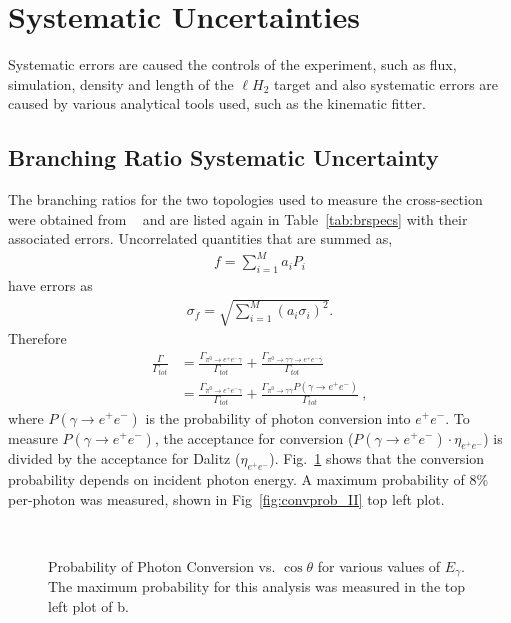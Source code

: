 \section{\label{sec:level1}Systematic Uncertainties}
 Systematic errors are caused the controls of the experiment, such as flux, simulation, density and length of the $\ell H_2$ target and also systematic errors are caused by various analytical tools used, such as the kinematic fitter.
 \subsection{Branching Ratio Systematic Uncertainty}
 The branching ratios for the two topologies used to measure the cross-section were obtained from \label{abbr:pdg}~\cite{pdg} and are listed again in Table~\ref{tab:brspecs} with their associated errors. Uncorrelated quantities that are summed as,
 \begin{align}
 	f = \sum_{i = 1}^{M}a_iP_i  
 \end{align}
 have errors as
 \begin{align}
 	\sigma_f = \sqrt{\sum_{i = 1}^{M}\left(a_i\sigma_i\right)^2}.  
 \end{align}
 Therefore
 \begin{align}
 	\frac{\Gamma}{\Gamma_{tot}} &  = \frac{\Gamma_{\pi^{0}\rightarrow e^{+}e^{-}\gamma}}{\Gamma_{tot}} + \frac{\Gamma_{\pi^{0}\rightarrow \gamma \gamma \to e^{+}e^{-}\gamma}}{\Gamma_{tot}}  \\ & = \frac{\Gamma_{\pi^{0}\rightarrow e^{+}e^{-}\gamma}}{\Gamma_{tot}} + \frac{\Gamma_{\pi^{0}\rightarrow \gamma \gamma}P(\gamma \to  e^{+}e^{-})}{\Gamma_{tot}} \ ,
 \end{align}
 where $P(\gamma \to  e^{+}e^{-})$ is the probability of photon conversion into $e^+e^-$. To measure $P(\gamma \to  e^{+}e^{-})$, the acceptance for conversion ($P(\gamma \to  e^{+}e^{-})\cdot\eta_{e^+e^-}$) is divided by the acceptance for Dalitz ($\eta_{e^+e^-}$). Fig.~\ref{fig:convprob_all} shows that the conversion probability depends on incident photon energy. A maximum probability of 8\%  per-photon was measured, shown in Fig~\ref{fig:convprob_II} top left plot. 
 \begin{figure}[h!]\begin{center}
 		\\
 		\caption[Probability of Photon Conversion vs. $\cos\theta$ for various values of $E_\gamma$]{\label{fig:convprob_all}Probability of Photon Conversion vs. $\cos\theta$ for various values of $E_\gamma$. The maximum probability for this analysis was measured in the top left plot of b.}
 	\end{center}\end{figure}
